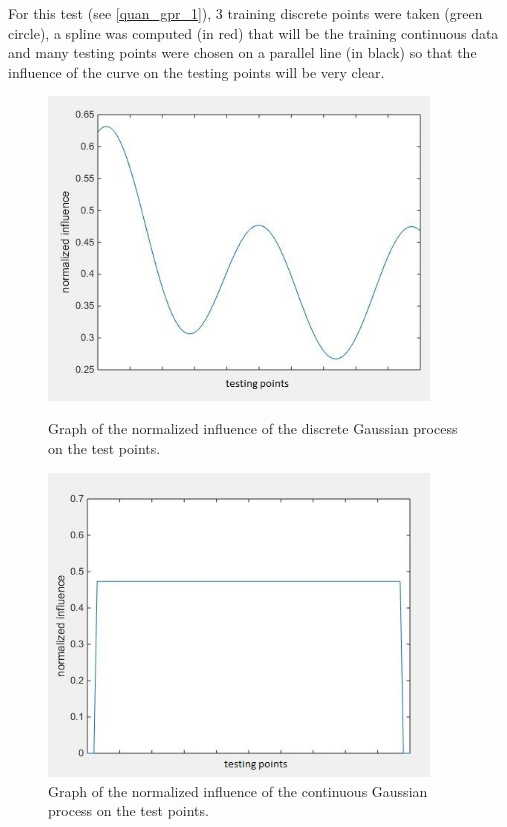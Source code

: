 For this test (see \autoref{quan_gpr_1}), 3 training discrete points were taken (green circle), a spline was computed (in red) that will be the training continuous data and many testing points were chosen on a parallel line (in black) so that the influence of the curve on the testing points will be very clear.

\begin{figure}[H]
    \begin{minipage}[b]{0.5\linewidth}
        \centering
        \includegraphics[width=0.90\textwidth]{img/discrete_gp_norm.jpg}
        \caption{Graph of the normalized influence of the discrete Gaussian process on the test points.}
        \label{discrete_gp_test}
    \end{minipage}
    \begin{minipage}[b]{0.5\linewidth}
        \centering 
        \includegraphics[width=0.90\textwidth]{img/continuous_gp_norm.jpg}
        \caption{Graph of the normalized influence of the continuous Gaussian process on the test points.}
        \label{continuous_gp_test}
    \end{minipage}\hfill
\end{figure}

